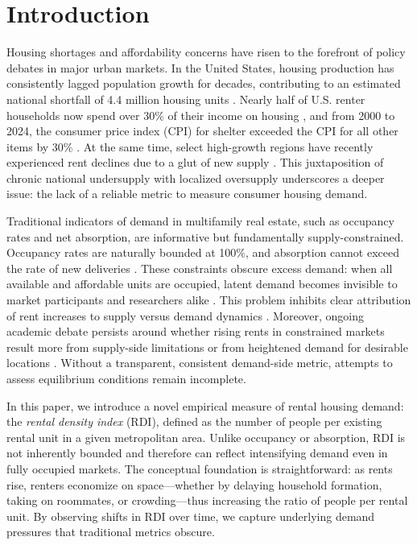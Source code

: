 \documentclass[APA,Times1COL]{WileyNJDv5} %
\begin{document}
\renewcommand\thefootnote{\fnsymbol{footnote}}
\setcounter{footnote}{1}
\FloatBarrier
\section{Introduction}\label{sec1}
Housing shortages and affordability concerns have risen to the forefront of policy debates in major urban markets. In the United States, housing production has consistently lagged population growth for decades, contributing to an estimated national shortfall of 4.4 million housing units \cite{betancourt2022us}. Nearly half of U.S. renter households now spend over 30\% of their income on housing \cite{censusNearlyHalf}, and from 2000 to 2024, the consumer price index (CPI) for shelter exceeded the CPI for all other items by 30\% \cite{stlouisfedConsumerPrice}. At the same time, select high-growth regions have recently experienced rent declines due to a glut of new supply \cite{mott2024ThisRegion}. This juxtaposition of chronic national undersupply with localized oversupply underscores a deeper issue: the lack of a reliable metric to measure consumer housing demand.

Traditional indicators of demand in multifamily real estate, such as occupancy rates and net absorption, are informative but fundamentally supply-constrained. Occupancy rates are naturally bounded at 100\%, and absorption cannot exceed the rate of new deliveries \cite{mueller1999real}. These constraints obscure excess demand: when all available and affordable units are occupied, latent demand becomes invisible to market participants and researchers alike \cite{gabriel2001rental, sirmans1991determinants, pyhrr1999real}. This problem inhibits clear attribution of rent increases to supply versus demand dynamics \cite{pennington2021does, molloy2022housing}. Moreover, ongoing academic debate persists around whether rising rents in constrained markets result more from supply-side limitations \cite{saiz2010geographic} or from heightened demand for desirable locations \cite{davidoff2015supply}. Without a transparent, consistent demand-side metric, attempts to assess equilibrium conditions remain incomplete.

In this paper, we introduce a novel empirical measure of rental housing demand: the \textit{rental density index} (RDI), defined as the number of people per existing rental unit in a given metropolitan area. Unlike occupancy or absorption, RDI is not inherently bounded and therefore can reflect intensifying demand even in fully occupied markets. The conceptual foundation is straightforward: as rents rise, renters economize on space---whether by delaying household formation, taking on roommates, or crowding---thus increasing the ratio of people per rental unit. By observing shifts in RDI over time, we capture underlying demand pressures that traditional metrics obscure.
\end{document}
